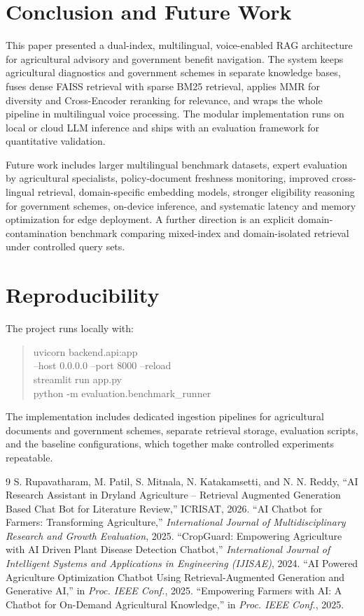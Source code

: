 \documentclass[10pt,twocolumn,letterpaper]{article}
\begin{document}
\section{Conclusion and Future Work}
This paper presented a dual-index, multilingual, voice-enabled RAG architecture for agricultural advisory and government benefit navigation. The system keeps agricultural diagnostics and government schemes in separate knowledge bases, fuses dense FAISS retrieval with sparse BM25 retrieval, applies MMR for diversity and Cross-Encoder reranking for relevance, and wraps the whole pipeline in multilingual voice processing. The modular implementation runs on local or cloud LLM inference and ships with an evaluation framework for quantitative validation.

Future work includes larger multilingual benchmark datasets, expert evaluation by agricultural specialists, policy-document freshness monitoring, improved cross-lingual retrieval, domain-specific embedding models, stronger eligibility reasoning for government schemes, on-device inference, and systematic latency and memory optimization for edge deployment. A further direction is an explicit domain-contamination benchmark comparing mixed-index and domain-isolated retrieval under controlled query sets.

\section{Reproducibility}
The project runs locally with:
\begin{quote}\ttfamily\footnotesize
uvicorn backend.api:app\\
\hspace*{1em}--host 0.0.0.0 --port 8000 --reload\\
streamlit run app.py\\
python -m evaluation.benchmark\_runner
\end{quote}
The implementation includes dedicated ingestion pipelines for agricultural documents and government schemes, separate retrieval storage, evaluation scripts, and the baseline configurations, which together make controlled experiments repeatable.

\begin{thebibliography}{9}
\footnotesize
{} S. Rupavatharam, M. Patil, S. Mitnala, N. Katakamsetti, and N. N. Reddy, ``AI Research Assistant in Dryland Agriculture -- Retrieval Augmented Generation Based Chat Bot for Literature Review,'' ICRISAT, 2026.
 ``AI Chatbot for Farmers: Transforming Agriculture,'' \textit{International Journal of Multidisciplinary Research and Growth Evaluation}, 2025.
 ``CropGuard: Empowering Agriculture with AI Driven Plant Disease Detection Chatbot,'' \textit{International Journal of Intelligent Systems and Applications in Engineering (IJISAE)}, 2024.
 ``AI Powered Agriculture Optimization Chatbot Using Retrieval-Augmented Generation and Generative AI,'' in \textit{Proc. IEEE Conf.}, 2025.
 ``Empowering Farmers with AI: A Chatbot for On-Demand Agricultural Knowledge,'' in \textit{Proc. IEEE Conf.}, 2025.
\end{thebibliography}
\end{document}
